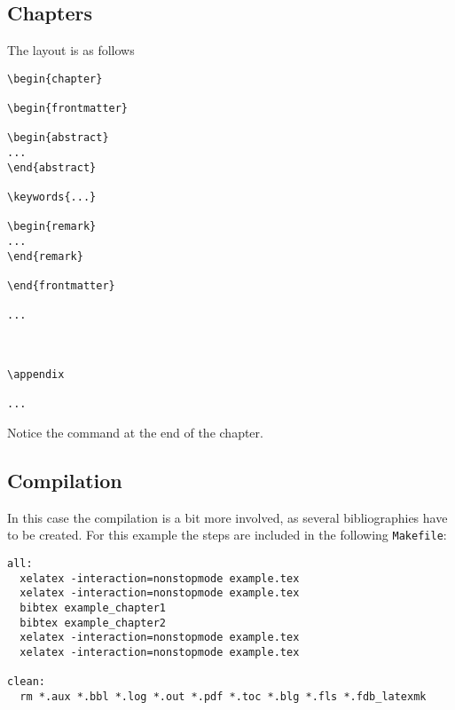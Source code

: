\subsection{Chapters}

The layout is as follows
\begin{mdframed}
\begin{verbatim}
\begin{chapter}

\begin{frontmatter}

\begin{abstract}
...
\end{abstract}

\keywords{...}

\begin{remark}
...
\end{remark}

\end{frontmatter}

...



\appendix

...

\end{verbatim}
\end{mdframed}

Notice the \verb|| command at the end of the chapter.

\subsection{Compilation}

In this case the compilation is a bit more involved, as several bibliographies have to be created. For this example the steps are included in the following \texttt{Makefile}:

\begin{mdframed}
\begin{verbatim}
all:
  xelatex -interaction=nonstopmode example.tex
  xelatex -interaction=nonstopmode example.tex
  bibtex example_chapter1
  bibtex example_chapter2
  xelatex -interaction=nonstopmode example.tex
  xelatex -interaction=nonstopmode example.tex

clean:
  rm *.aux *.bbl *.log *.out *.pdf *.toc *.blg *.fls *.fdb_latexmk
\end{verbatim}
\end{mdframed}

